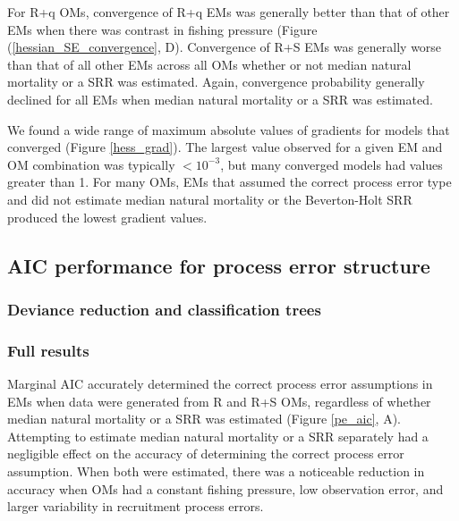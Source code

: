 \documentclass[
  12pt,
]{article}
\begin{document}
For R+q OMs, convergence of R+q EMs was generally better than that of
other EMs when there was contrast in fishing pressure (Figure
(\ref{hessian_SE_convergence}, D). Convergence of R+S EMs was generally
worse than that of all other EMs across all OMs whether or not median
natural mortality or a SRR was estimated. Again, convergence probability
generally declined for all EMs when median natural mortality or a SRR
was estimated.

We found a wide range of maximum absolute values of gradients for models
that converged (Figure \ref{hess_grad}). The largest value observed for
a given EM and OM combination was typically \(<10^{-3}\), but many
converged models had values greater than 1. For many OMs, EMs that
assumed the correct process error type and did not estimate median
natural mortality or the Beverton-Holt SRR produced the lowest gradient
values.

\subsection*{AIC performance for process error
structure}\label{aic-performance-for-process-error-structure}

\subsubsection*{Deviance reduction and classification
trees}\label{deviance-reduction-and-classification-trees-1}

\subsubsection*{Full results}\label{full-results-1}

Marginal AIC accurately determined the correct process error assumptions
in EMs when data were generated from R and R+S OMs, regardless of
whether median natural mortality or a SRR was estimated (Figure
\ref{pe_aic}, A). Attempting to estimate median natural mortality or a
SRR separately had a negligible effect on the accuracy of determining
the correct process error assumption. When both were estimated, there
was a noticeable reduction in accuracy when OMs had a constant fishing
pressure, low observation error, and larger variability in recruitment
process errors.
\end{document}
